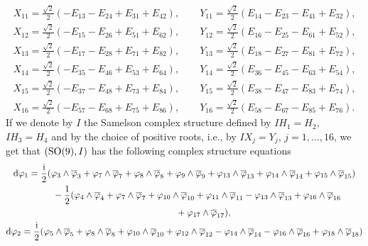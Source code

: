\documentclass[pdftex]{sigma}
\numberwithin{equation}{section}
\begin{document}
\begin{Example}
\begin{gather*}
 X_{11} = \frac{\sqrt{2}}{2} (-E_{13} - E_{24} + E_{31} + E_{42}), \qquad Y_{11} = \frac{\sqrt{2}}{2} (E_{14} - E_{23} - E_{41} + E_{32}),\\
 X_{12} = \frac{\sqrt{2}}{2} (-E_{15} - E_{26} + E_{51} + E_{62}), \qquad Y_{12} = \frac{\sqrt{2}}{2} (E_{16} - E_{25} - E_{61} + E_{52}),\\
 X_{13} = \frac{\sqrt{2}}{2} (-E_{17} - E_{28} + E_{71} + E_{82}), \qquad Y_{13} = \frac{\sqrt{2}}{2} (E_{18} - E_{27} - E_{81} + E_{72}),
\\
 X_{14} = \frac{\sqrt{2}}{2} (-E_{35} - E_{46} + E_{53} + E_{64}), \qquad Y_{14} = \frac{\sqrt{2}}{2} (E_{36} - E_{45} - E_{63} + E_{54}),\\
 X_{15} = \frac{\sqrt{2}}{2} (-E_{37} - E_{48} + E_{73} + E_{84}), \qquad Y_{15} = \frac{\sqrt{2}}{2} (E_{38} - E_{47} - E_{83} + E_{74}),\\
 X_{16} = \frac{\sqrt{2}}{2} (-E_{57} - E_{68} + E_{75} + E_{86}), \qquad Y_{16} = \frac{\sqrt{2}}{2} (E_{58} - E_{67} - E_{85} + E_{76}).
\end{gather*}
If we denote by $I$ the Samelson complex structure defined by $I H_1= H_2$, $I H_3 = H_4$ and by the choice of positive roots, i.e., by $I X_j= Y_j$, $j = 1, \dots, 16$, we get that $({\rm SO}(9), I)$ has the following complex structure equations
\begin{gather*}
{\rm d} \varphi_1 = \frac{{\rm i}}{2} ( \varphi_3 \wedge \overline \varphi_3 + \varphi_7 \wedge \overline \varphi_7 + \varphi_8 \wedge \overline \varphi_8 + \varphi_9 \wedge \overline \varphi_9 + \varphi_{13} \wedge \overline \varphi_{13} + \varphi_{14} \wedge \overline \varphi_{14} +\varphi_{15} \wedge \overline \varphi_{15})\\
 \hphantom{{\rm d} \varphi_1 =}{} - \frac{1}{2} ( \varphi_4 \wedge \overline \varphi_4 + \varphi_7 \wedge \overline \varphi_7 + \varphi_{10} \wedge \overline \varphi_{10} + \varphi_{11} \wedge \overline \varphi_{11} - \varphi_{13} \wedge \overline \varphi_{13} +\varphi_{16} \wedge \overline \varphi_{16}\\
\hphantom{{\rm d} \varphi_1 =\frac{{\rm i}}{2} ( }{}
 +\varphi_{17} \wedge \overline \varphi_{17}),\\
{\rm d} \varphi_2 = \frac{{\rm i}}{2} ( \varphi_5 \wedge \overline \varphi_5 + \varphi_8 \wedge \overline \varphi_8 + \varphi_{10} \wedge \overline \varphi_{10} + \varphi_{12} \wedge \overline \varphi_{12} - \varphi_{14} \wedge \overline \varphi_{14} - \varphi_{16} \wedge \overline \varphi_{16} +\varphi_{18} \wedge \overline \varphi_{18})\\

\end{gather*}
\end{Example}
\end{document}
